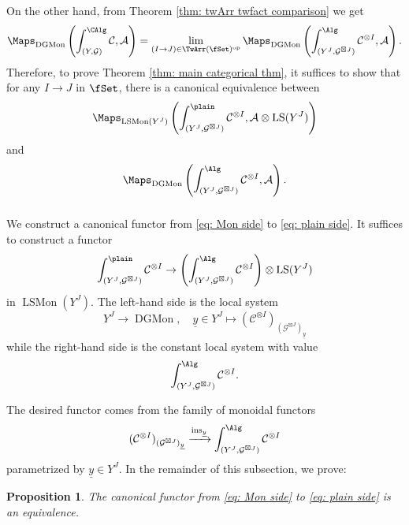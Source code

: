 \documentclass[10pt]{amsart}
\newcommand{\sssec}{\subsubsection}
\newtheorem{prop}[subsubsection]{Proposition}
\theoremstyle{remark}
\newcommand{\ul}{\underline}
\newcommand{\on}{\operatorname}
\newcommand{\cA}{\mathcal{A}}
\newcommand{\cC}{\mathcal{C}}
\newcommand{\cG}{\mathcal{G}}
\newcommand{\LSMon}{\on{LSMon}}
\newcommand{\DGCatMon}{\on{DGMon}}
\newcommand{\LS}{\on{LS}}
\DeclareMathOperator{\op}{op}
\begin{document}
    On the other hand, from Theorem \ref{thm: twArr twfact comparison} we get
    \[\Maps_{\DGCatMon}\left(\int^{\CAlg}_{(Y,\cG)} \cC,\cA\right) = \lim_{(I\rightarrow J)\in\TwArr(\fSet)^{\op}}\Maps_{\DGCatMon}\left(\int^{\Alg}_{(Y^J,\cG^{\boxtimes J})}\cC^{\otimes I}, \cA\right).\]
    Therefore, to prove Theorem \ref{thm: main categorical thm}, it suffices to show that for any $I\rightarrow J$ in $\fSet$, there is a canonical equivalence between
    \begin{equation}\label{eq: plain side}
        \Maps_{\LSMon(Y^J)}\left(\int^{\plain}_{(Y^J,\cG^{\boxtimes J})}\cC^{\otimes I},  \cA\otimes\LS(Y^J)\right)
    \end{equation}
    and
    \begin{equation}\label{eq: Mon side}
        \Maps_{\DGCatMon}\left(\int^{\Alg}_{(Y^J,\cG^{\boxtimes J})}\cC^{\otimes I}, \cA\right).
    \end{equation}


    \sssec{}\label{sssec: functor from Mon to plain}
We construct a canonical functor from \eqref{eq: Mon side} to \eqref{eq: plain side}. It suffices to construct a functor
\[\int^{\plain}_{(Y^J,\cG^{\boxtimes J})}\cC^{\otimes I}\rightarrow \left(\int^{\Alg}_{(Y^J,\cG^{\boxtimes J})}\cC^{\otimes I}\right)\otimes \LS(Y^J)\]
in $\LSMon(Y^J)$. 
The left-hand side is the local system
\[Y^J\rightarrow \DGCatMon,\quad \ul{y}\in Y^J\mapsto (\cC^{\otimes I})_{(\cG^{\boxtimes J})_{\ul{y}}}\]
while the right-hand side is the constant local system with value 
\[ \int^{\Alg}_{(Y^J,\cG^{\boxtimes J})}\cC^{\otimes I}.
\]

The desired functor comes from the family of monoidal functors
\begin{equation}\label{eq: comparison as Alg}
    (\cC^{\otimes I})_{(\cG^{\boxtimes J})_{\ul{y}}}\xrightarrow{\on{ins}_{\ul{y}}}\int^{\Alg}_{(Y^J,\cG^{\boxtimes J})}\cC^{\otimes I}
\end{equation}
parametrized by $\ul{y}\in Y^J$. 
In the remainder of this subsection, we prove:

\begin{prop}\label{prop: Mon side and plain side}
    The canonical functor from \eqref{eq: Mon side} to \eqref{eq: plain side} 
    is an equivalence.
    \end{prop}
\end{document}
